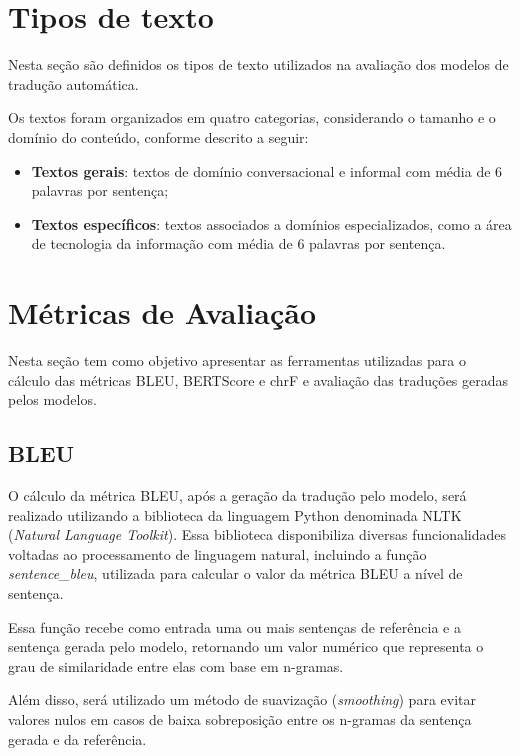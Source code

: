 \section{Tipos de texto}
\label{Text-type}
Nesta seção são definidos os tipos de texto utilizados na avaliação dos modelos de tradução automática.

Os textos foram organizados em quatro categorias, considerando o tamanho e o domínio do conteúdo, conforme descrito a seguir:

\begin{itemize}
    \item \textbf{Textos gerais}: textos de domínio conversacional e informal com média de 6 palavras por sentença;

    \item \textbf{Textos específicos}: textos associados a domínios especializados, como a área de tecnologia da informação com média de 6 palavras por sentença.

\end{itemize}


\section{Métricas de Avaliação}

Nesta seção tem como objetivo apresentar as ferramentas utilizadas para o cálculo das métricas BLEU, BERTScore e chrF e avaliação das traduções geradas pelos modelos.

\subsection{BLEU}

O cálculo da métrica BLEU, após a geração da tradução pelo modelo, será realizado utilizando a biblioteca da linguagem Python denominada NLTK (\textit{Natural Language Toolkit}). Essa biblioteca disponibiliza diversas funcionalidades voltadas ao processamento de linguagem natural, incluindo a função \textit{sentence\_bleu}, utilizada para calcular o valor da métrica BLEU a nível de sentença.

Essa função recebe como entrada uma ou mais sentenças de referência e a sentença gerada pelo modelo, retornando um valor numérico que representa o grau de similaridade entre elas com base em n-gramas.

Além disso, será utilizado um método de suavização (\textit{smoothing}) para evitar valores nulos em casos de baixa sobreposição entre os n-gramas da sentença gerada e da referência.

